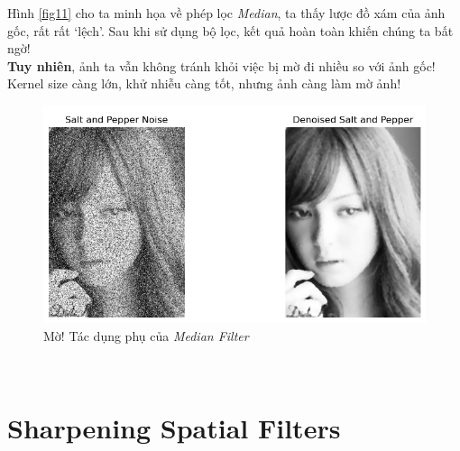 \documentclass{article}
\begin{document}
    Hình \ref{fig11} cho ta minh họa về phép lọc \textit{Median}, ta thấy lược đồ xám của ảnh gốc, rất rất `lệch'. Sau khi sử dụng bộ lọc, kết quả hoàn toàn khiến chúng ta bất ngờ!\\
    \textbf{Tuy nhiên}, ảnh ta vẫn không tránh khỏi việc bị mờ đi nhiều so với ảnh gốc! Kernel size càng lớn, khử nhiễu càng tốt, nhưng ảnh càng làm mờ ảnh!
    \begin{figure}[ht!]
        \centering
        \includegraphics[width = \linewidth]{download (11).png}
        \caption{Mờ! Tác dụng phụ của \textit{Median Filter}}
        \label{fig11_}
    \end{figure} \\  
    \section{Sharpening Spatial Filters}
\end{document}

